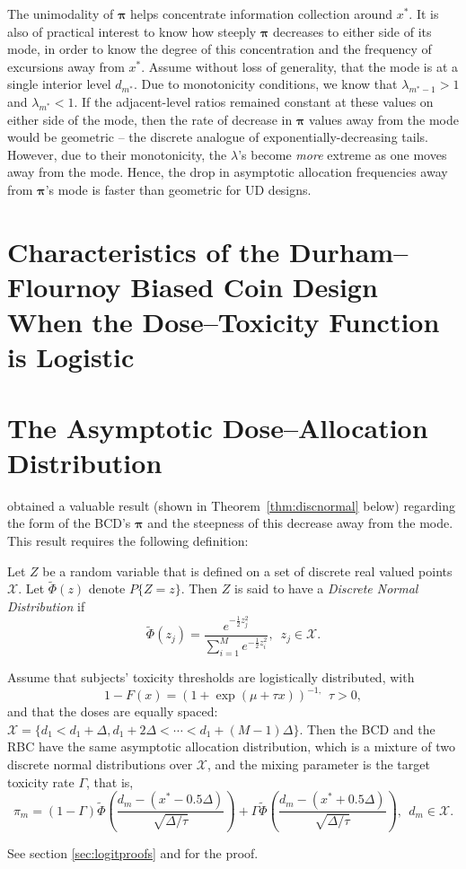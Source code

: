 The unimodality of $\boldsymbol{\pi}$ helps concentrate information collection around $x^*$. It is also of practical interest to know how steeply $\boldsymbol{\pi}$ decreases to either side of its mode, in order to know the degree of this concentration and the frequency of excursions away from $x^*$. Assume without loss of generality, that the mode is at a single interior level $d_{m^*}$. Due to monotonicity conditions, we know that $\lambda_{m^*-1}>1$ and $\lambda_{m^*}<1$. If the adjacent-level ratios remained constant at these values on either side of the mode, then the rate of decrease in $\boldsymbol{\pi}$ values away from the mode would be geometric -- the discrete analogue of exponentially-decreasing tails. However, due to their monotonicity, the $\lambda$'s become \emph{more} extreme as one moves away from the mode. Hence, the drop in asymptotic allocation frequencies away from $\boldsymbol{\pi}$'s mode is faster than geometric for UD designs.


\section{Characteristics of the Durham--Flournoy Biased Coin Design When the Dose--Toxicity Function is Logistic}\label{sec:logistic}
\section{The Asymptotic Dose--Allocation Distribution}
\cite{Durh:Flou:rand:1994} obtained a valuable result (shown in Theorem~\ref{thm:discnormal} below) regarding the form of the BCD's $\boldsymbol{\pi}$ and the steepness of this decrease away from the mode. This result requires the following definition:
\begin{defn}
Let $Z$ be a random variable that is defined on a set of discrete
real valued points $\mathcal{X}$.  Let $\tilde{\Phi}(z)$ denote $P\{Z=z\}$.  Then $Z$ is said to have a \emph{Discrete Normal Distribution} if
\begin{equation*}
\tilde{\Phi}(z_j)=\frac{e^{-\frac{1}{2}z_j^2}}{\sum_{i=1}^Me^{-\frac{1}{2}z_i^2}},\,\,\,z_j\in\mathcal{X}.
\end{equation*}
\end{defn}
\begin{thm}\label{thm:discnormal}
Assume that subjects' toxicity thresholds are logistically distributed, with $$1-F(x)=(1+\exp(\mu+\tau x))^{-1,}\ \ \tau>0,$$ and that the doses are equally spaced: $\mathcal{X}=\{d_1<d_1+\Delta,d_1+2\Delta<\cdots<d_1+(M-1)\Delta\}.$ Then the BCD and the RBC have the same asymptotic allocation distribution, which is a mixture of two discrete normal distributions over $\mathcal{X}$,  and  the mixing parameter is the target toxicity rate $\Gamma$, that is,
%
\begin{equation}\label{eq:discnormal}
\pi_m=(1-\Gamma)\tilde{\Phi}\left(\frac{d_m-(x^*-0.5\Delta)}{\sqrt{\Delta/\tau}}\right)+
\Gamma\tilde{\Phi}\left(\frac{d_m-(x^*+0.5\Delta)}{\sqrt{\Delta/\tau}}\right),\ \ d_m\in\mathcal{X}.
\end{equation}
\end{thm}
%
See section \ref{sec:logitproofs} and \cite{Durh:Flou:rand:1994} for the proof.

